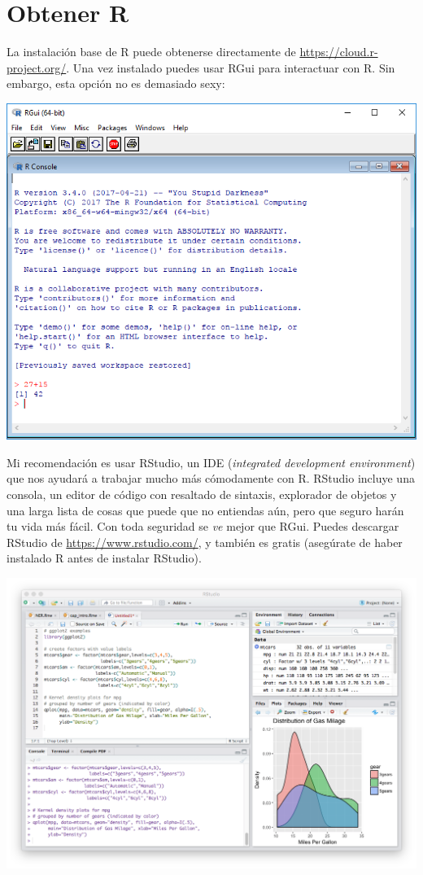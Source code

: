 \documentclass[12pt]{report}\usepackage[]{graphicx}\usepackage[]{color}
\newcommand*{\eng}[1]{\textsl{#1}}
\begin{document}
\section{Obtener R}

La instalación base de R puede obtenerse directamente de \url{https://cloud.r-project.org/}. Una vez instalado puedes usar RGui para interactuar con R. Sin embargo, esta opción no es demasiado sexy:

\begin{center}
\vspace{\baselineskip}
\includegraphics[width=.66\linewidth]{sss/rgui-win-42}
\vspace{\baselineskip}
\end{center}

Mi recomendación es usar RStudio, un IDE (\eng{integrated development environment}) que nos ayudará a trabajar mucho más cómodamente con R. RStudio incluye una consola, un editor de código con resaltado de sintaxis, explorador de objetos y una larga lista de cosas que puede que no entiendas aún, pero que seguro harán tu vida más fácil. Con toda seguridad se \emph{ve} mejor que RGui. Puedes descargar RStudio de \url{https://www.rstudio.com/}, y también es gratis (asegúrate de haber instalado R antes de instalar RStudio).

\includegraphics[width=\linewidth]{sss/rstudio-mac}
\end{document}
